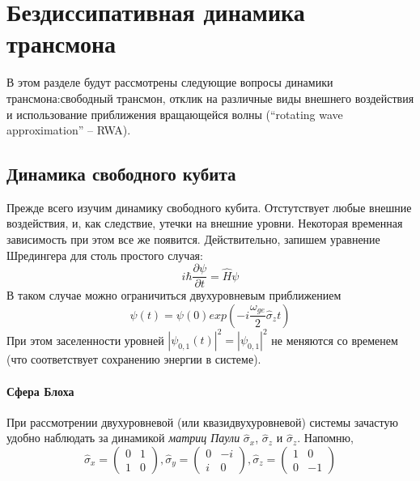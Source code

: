 \documentclass[12pt, twoside]{report}
\numberwithin{equation}{section}
\numberwithin{figure}{section}
\begin{document}
\section{Бездиссипативная динамика трансмона}
В этом разделе будут рассмотрены следующие вопросы динамики трансмона:свободный трансмон, отклик на различные виды внешнего воздействия и использование приближения вращающейся волны (``rotating wave approximation'' -- RWA).
\subsection{Динамика свободного кубита}
Прежде всего изучим динамику свободного кубита. Отстутствует любые внешние воздействия, и, как следствие, утечки на внешние уровни. Некоторая временная зависимость при этом все же появится. Действительно, запишем уравнение Шредингера для столь простого случая:
\begin{equation}
i \hbar \frac{\partial \psi} {\partial t} = \hat{H} \psi 
\label{eq:shrodinger-eq-simpliest-2d}
\end{equation}
В таком случае можно ограничиться двухуровневым приближением
\begin{equation}
\psi(t) = \psi(0) exp\left(-i \frac{\omega_{ge}}{2} \hat{\sigma}_z t\right) 
\label{eq:shrodinger-sol-simpliest-2d}
\end{equation}
При этом заселенности уровней $|\psi_{0,1}(t)|^2 = |\psi_{0,1}|^2$ не меняются со временем (что соответствует сохранению энергии в системе). 
\paragraph{Сфера Блоха} При рассмотрении двухуровневой (или квазидвухуровневой) системы зачастую удобно наблюдать за динамикой \textit{матриц Паули} $\hat{\sigma}_x$, $\hat{\sigma}_z$ и $\hat{\sigma}_z$. Напомню, 
\begin{equation}
\hat{\sigma}_x = \left(\begin{matrix} 0 & 1 \\ 1 & 0 \end{matrix} \right),
\hat{\sigma}_y = \left(\begin{matrix} 0 & -i \\ i & 0 \end{matrix} \right),
\hat{\sigma}_z = \left(\begin{matrix} 1 & 0 \\ 0 & -1 \end{matrix} \right)
\end{equation}
\end{document}
